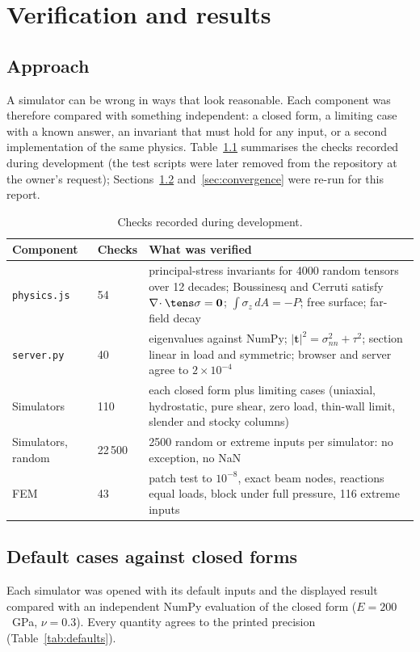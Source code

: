 \chapter{Verification and results}
\label{ch:verify}

\section{Approach}
A simulator can be wrong in ways that look reasonable. Each component was therefore compared with something independent: a closed form, a limiting case with a known answer, an invariant that must hold for any input, or a second implementation of the same physics. Table~\ref{tab:checks} summarises the checks recorded during development (the test scripts were later removed from the repository at the owner's request); Sections~\ref{sec:defaults} and~\ref{sec:convergence} were re-run for this report.

\begin{table}[ht]\centering\small
\caption{Checks recorded during development.}\label{tab:checks}
\begin{tabular}{@{}p{2.6cm}p{1.3cm}p{11.6cm}@{}}\toprule
Component & Checks & What was verified\\\midrule
\texttt{physics.js} & 54 & principal-stress invariants for 4000 random tensors over 12 decades; Boussinesq and Cerruti satisfy $\nabla\!\cdot\tens\sigma=\mathbf0$; $\int\sigma_z\,dA=-P$; free surface; far-field decay\\
\texttt{server.py} & 40 & eigenvalues against NumPy; $|\mathbf t|^2=\sigma_{nn}^2+\tau^2$; section linear in load and symmetric; browser and server agree to $2\times10^{-4}$\\
Simulators & 110 & each closed form plus limiting cases (uniaxial, hydrostatic, pure shear, zero load, thin-wall limit, slender and stocky columns)\\
Simulators, random & 22\,500 & 2500 random or extreme inputs per simulator: no exception, no NaN\\
FEM & 43 & patch test to $10^{-8}$, exact beam nodes, reactions equal loads, block under full pressure, 116 extreme inputs\\\bottomrule
\end{tabular}
\end{table}

\section{Default cases against closed forms}
\label{sec:defaults}
Each simulator was opened with its default inputs and the displayed result compared with an independent NumPy evaluation of the closed form ($E=200$~GPa, $\nu=0.3$). Every quantity agrees to the printed precision (Table~\ref{tab:defaults}).

